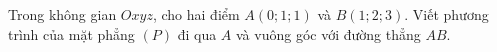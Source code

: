 \begin{ex}
Trong không gian $Oxyz$, cho hai điểm $A(0;1;1)$ và $B(1;2;3)$. Viết phương trình của mặt phẳng $(P)$ đi qua $A$ và vuông góc với đường thẳng $AB$.
\end{ex}
